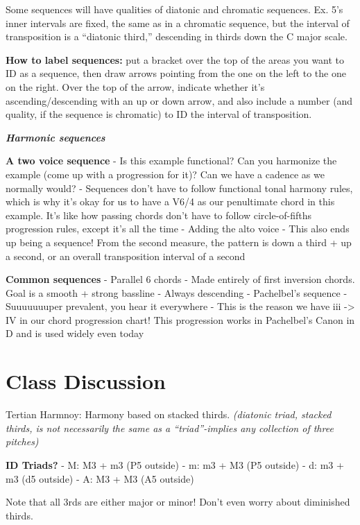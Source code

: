 \documentclass{book}
\begin{document}
Some sequences will have qualities of diatonic and chromatic sequences. Ex.
5's inner intervals are fixed, the same as in a chromatic sequence, but the
interval of transposition is a ``diatonic third,'' descending in thirds down
the C major scale.

\textbf{How to label sequences:} put a bracket over the top of the areas you
want to ID as a sequence, then draw arrows pointing from the one on the left
to the one on the right. Over the top of the arrow, indicate whether it's
ascending/descending with an up or down arrow, and also include a number (and
quality, if the sequence is chromatic) to ID the interval of transposition.

\textbf{\emph{Harmonic sequences}}

\textbf{A two voice sequence} - Is this example functional? Can you harmonize
the example (come up with a progression for it)? Can we have a cadence as we
normally would? - Sequences don't have to follow functional tonal harmony
rules, which is why it's okay for us to have a V6/4 as our penultimate chord
in this example. It's like how passing chords don't have to follow
circle-of-fifths progression rules, except it's all the time - Adding the alto
voice - This also ends up being a sequence! From the second measure, the
pattern is down a third + up a second, or an overall transposition interval of
a second

\textbf{Common sequences} - Parallel 6 chords - Made entirely of first
inversion chords. Goal is a smooth + strong bassline - Always descending -
Pachelbel's sequence - Suuuuuuuper prevalent, you hear it everywhere - This is
the reason we have iii -\textgreater{} IV in our chord progression chart! This
progression works in Pachelbel's Canon in D and is used widely even today

\hypertarget{class-discussion-12}{%
\chapter{Class Discussion}\label{class-discussion-12}}

Tertian Harmnoy: Harmony based on stacked thirds. \emph{(diatonic triad,
stacked thirds, is not necessarily the same as a ``triad''-implies any
collection of three pitches)}

\textbf{ID Triads?} - M: M3 + m3 (P5 outside) - m: m3 + M3 (P5 outside) - d:
m3 + m3 (d5 outside) - A: M3 + M3 (A5 outside)

Note that all 3rds are either major or minor! Don't even worry about
diminished thirds.
\end{document}
